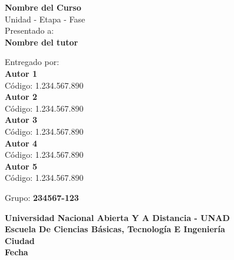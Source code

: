 \begin{titlepage}
	\begin{center}
		\Large
		\textbf{Nombre del Curso}\\
		\vspace{0.5cm}
		\large
		Unidad - Etapa - Fase\\
		\vspace{1cm}
		Presentado a:\\
		\vspace{0.3cm}
		\Large
		\textbf{Nombre del tutor}\\	
		\vspace{0.5cm}

		\vfill

		\large
		Entregado por:\\
		\vspace{0.3cm}
		\Large
		\textbf{Autor 1}\\
		\vspace{0.2cm}
		\large	
		Código: 1.234.567.890\\
		\vspace{0.3cm}
		\Large
		\textbf{Autor 2}\\
		\vspace{0.2cm}
		\large	
		Código: 1.234.567.890\\
		\vspace{0.3cm}
		\Large
		\textbf{Autor 3}\\
		\vspace{0.2cm}
		\large	
		Código: 1.234.567.890\\
		\vspace{0.3cm}
		\Large
		\textbf{Autor 4}\\
		\vspace{0.2cm}
		\large	
		Código: 1.234.567.890\\
		\vspace{0.3cm}
		\Large
		\textbf{Autor 5}\\
		\vspace{0.2cm}
		\large	
		Código: 1.234.567.890\\
		\vspace{1cm}

		Grupo: \textbf{234567-123}\\
		\vspace{1.0cm}

		\vfill

		\Large
		\textbf{Universidad Nacional Abierta Y A Distancia - UNAD}\\
		\vspace{0.3cm}
		\textbf{Escuela De Ciencias Básicas, Tecnología E Ingeniería}\\
		\vspace{0.3cm}
		\textbf{Ciudad}\\
		\vspace{0.3cm}
		\textbf{Fecha}
		\pagebreak

	\end{center}	
\end{titlepage}
